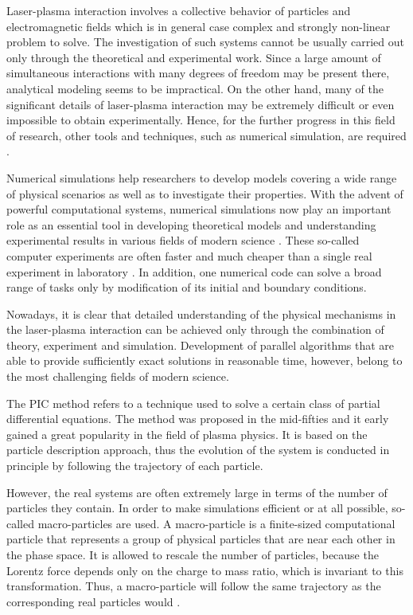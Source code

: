 Laser-plasma interaction involves a collective behavior of particles and electromagnetic fields which is in general case complex and strongly non-linear problem to solve. The investigation of such systems cannot be usually carried out only through the theoretical and experimental work. Since a large amount of simultaneous interactions with many degrees of freedom may be present there, analytical modeling seems to be impractical. On the other hand, many of the significant details of laser-plasma interaction may be extremely difficult or even impossible to obtain experimentally. Hence, for the further progress in this field of research, other tools and techniques, such as numerical simulation, are required \cite{jaroszynsky}.

Numerical simulations help researchers to develop models covering a wide range of physical scenarios as well as to investigate their properties. With the advent of powerful computational systems, numerical simulations now play an important role as an essential tool in developing theoretical models and understanding experimental results in various fields of modern science \cite{pang}. These so-called computer experiments are often faster and much cheaper than a single real experiment in laboratory \cite{gould}. In addition, one numerical code can solve a broad range of tasks only by modification of its initial and boundary conditions.

Nowadays, it is clear that detailed understanding of the physical mechanisms in the laser-plasma interaction can be achieved only through the combination of theory, experiment and simulation. Development of parallel algorithms that are able to provide sufficiently exact solutions in reasonable time, however, belong to the most challenging fields of modern science.

The PIC method refers to a technique used to solve a certain class of partial differential equations. The method was proposed in the mid-fifties and it early gained a great popularity in the field of plasma physics. It is based on the particle description approach, thus the evolution of the system is conducted in principle by following the trajectory of each particle.

However, the real systems are often extremely large in terms of the number of particles they contain. In order to make simulations efficient or at all possible, so-called macro-particles are used. A macro-particle is a finite-sized computational particle that represents a group of physical particles that are near each other in the phase space. It is allowed to rescale the number of particles, because the Lorentz force depends only on the charge to mass ratio, which is invariant to this transformation. Thus, a macro-particle will follow the same trajectory as the corresponding real particles would \cite{hockney}.

